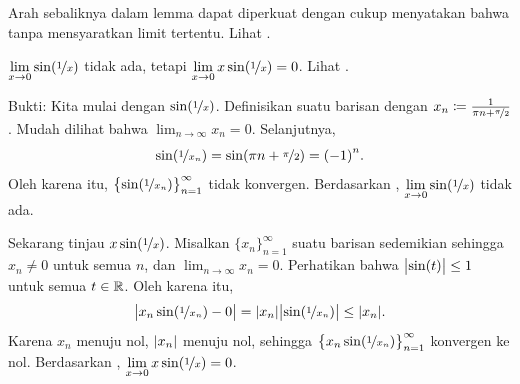 Arah sebaliknya dalam lemma dapat diperkuat dengan cukup menyatakan bahwa
 tanpa mensyaratkan limit tertentu.
Lihat .

\begin{example}
$\displaystyle \lim_{x \to 0} \sin( \nicefrac{1}{x} )$
tidak ada, tetapi
$\displaystyle \lim_{x \to 0} x\sin( \nicefrac{1}{x} ) = 0$.
Lihat .

\begin{myfigureht}
\caption{Grafik $\sin(\nicefrac{1}{x})$ dan $x \sin(\nicefrac{1}{x})$.
Perhatikan bahwa komputer tidak dapat menggambar $\sin(\nicefrac{1}{x})$ dengan tepat
di dekat nol karena fungsi tersebut berosilasi terlalu cepat.\label{figsin1x}}
\end{myfigureht}

Bukti:
Kita mulai dengan $\sin(\nicefrac{1}{x})$.  Definisikan suatu barisan
dengan
$x_n \coloneqq \frac{1}{\pi n + \nicefrac{\pi}{2}}$.  Mudah dilihat
bahwa $\lim_{n\to\infty} x_n = 0$.  Selanjutnya,
\begin{equation*}
\sin ( \nicefrac{1}{x_n} )
=
\sin (\pi n + \nicefrac{\pi}{2})
= {(-1)}^n .
\end{equation*}
Oleh karena itu, $\bigl\{ \sin ( \nicefrac{1}{x_n} ) \bigr\}_{n=1}^\infty$ tidak konvergen.
Berdasarkan
,
$\displaystyle \lim_{x \to 0} \sin( \nicefrac{1}{x} )$ tidak ada.

Sekarang tinjau $x\sin(\nicefrac{1}{x})$.  Misalkan $\{ x_n \}_{n=1}^\infty$ suatu barisan
sedemikian sehingga $x_n \neq 0$ untuk semua $n$, dan $\lim_{n\to\infty} x_n = 0$.
Perhatikan bahwa $\bigl\lvert {\sin(t)} \bigr\rvert \leq 1$ untuk semua $t \in {\mathbb{R}}$.  Oleh karena itu,
\begin{equation*}
\bigl\lvert {x_n\sin(\nicefrac{1}{x_n})-0} \bigr\rvert
=
\lvert {x_n} \rvert\bigl\lvert {\sin(\nicefrac{1}{x_n})} \bigr\rvert
\leq
\lvert {x_n} \rvert .
\end{equation*}
Karena $x_n$ menuju nol, $\lvert {x_n} \rvert$ menuju nol, sehingga
$\bigl\{ x_n\sin(\nicefrac{1}{x_n}) \bigr\}_{n=1}^\infty$ konvergen ke nol.  Berdasarkan
,
$\displaystyle \lim_{x \to 0} x\sin( \nicefrac{1}{x} ) = 0$.
\end{example}

